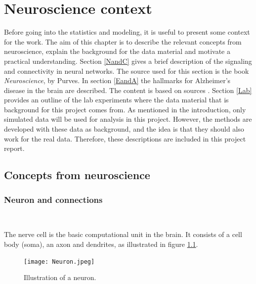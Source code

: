 
\chapter{Neuroscience context}

Before going into the statistics and modeling, it is useful to present some context for the work. The aim of this chapter is to describe the relevant concepts from neuroscience, explain the background for the data material and motivate a practical understanding. Section \ref{NandC} gives a brief description of the signaling and connectivity in neural networks. The source used for this section is the book \textit{Neuroscience}, by Purves. In section \ref{EandA} the hallmarks for Alzheimer's disease in the brain are described. The content is based on sources \cite{Gomez,Witter:2011, Alz}. Section \ref{Lab} provides an outline of the lab experiments where the data material that is background for this project comes from. As mentioned in the introduction, only simulated data will be used for analysis in this project. However, the methods are developed with these data as background, and the idea is that they should also work for the real data. Therefore, these descriptions are included in this project report.  



\section{Concepts from neuroscience}


\subsection{Neuron and connections}\\
\label{NandC}



 The nerve cell is the basic computational unit in the brain. It consists of a cell body (soma), an axon and dendrites, as illustrated in figure \ref{neuron}.
\begin{figure}[h]
    \caption{Illustration of a neuron.}
    \label{neuron}
    \centering
    \texttt{[image: Neuron.jpeg]}
\end{figure} 


